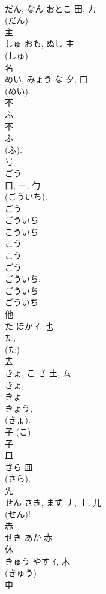 \documentclass[8pt]{extreport}
\begin{document}
\begin{CJK}{UTF8}{min}
\\	だん, なん	おとこ	田, 力	
\\	(だん). 
\\	主	
\\	しゅ	おも, ぬし	主	
\\	(しゅ) 
\\	名	
\\	めい, みょう	な	夕, 口	
\\	(めい). 
\\	不	
\\	ふ	
\\	不	
\\	ふ 
\\	(ふ).
\\	号	
\\	ごう	
\\	口, 一, 勹	
\\	(ごういち). 
\\	ごう 
\\	ごういち 
\\	こういち 
\\	こう 
\\	こう 
\\	ごう 
\\	ごういち.
\\	ごういち 
\\	ごういち 
\\	他	
\\	た	ほか	ｲ, 也	
\\	た, 
\\	(た) 
\\	去	
\\	きょ, こ	さ	土, ム	
\\	きょ, 
\\	きょ 
\\	きょう, 
\\	(きょ). 
\\	子 (こ) 
\\	子 
\\	皿	
\\	さら	皿	
\\	(さら). 
\\	先	
\\	せん	さき, まず	丿, 土, 儿	
\\	(せん)! 
\\	赤	
\\	せき	あか	赤	
\\	休	
\\	きゅう	やす	ｲ, 木	
\\	(きゅう) 
\\	申	

\end{CJK}
\end{document}
